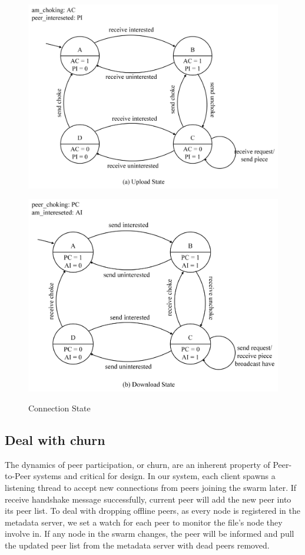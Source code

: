 \documentclass[conference]{IEEEtran}
\begin{document}
	\begin{figure}
		\centering
				\includegraphics[width=0.9\linewidth]{f1.png}
				\label{fig:sub1}
			
				\includegraphics[width=0.9\linewidth]{f2.png}
				\label{fig:sub1}
		\caption{Connection State}
		\label{fig:side:b}
	\end{figure}
	

	
	\subsection{Deal with churn}
	The dynamics of peer participation, or churn, are an inherent property of Peer-to-Peer  systems and critical for design. In our system, each client spawns a listening thread to accept new connections from peers joining the swarm later. If receive handshake message successfully, current peer will add the new peer into its peer list. To deal with dropping offline peers, as every node is registered in the metadata server, we set a watch for each peer to monitor the file's node they involve in. If any node in the swarm changes, the peer will be informed and pull the updated peer list from the metadata server with dead peers removed.
	
\end{document}
